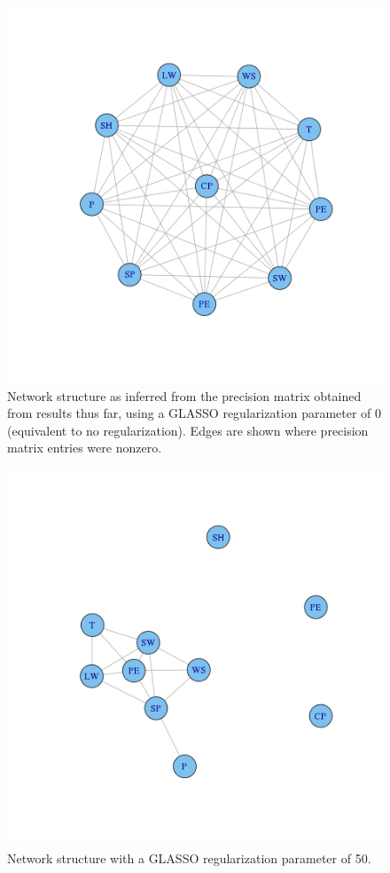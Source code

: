 \documentclass{article}
\begin{document}
\begin{figure}
\includegraphics[width=0.9\columnwidth]{images/data_0.png}
\caption{Network structure as inferred from the precision matrix obtained from results thus far, using a GLASSO regularization parameter of 0 (equivalent to no regularization). Edges are shown where precision matrix entries were nonzero.}
\label{fig:data_0}
\end{figure}

\begin{figure}
\includegraphics[width=0.9\columnwidth]{images/data_50.png}
\caption{Network structure with a GLASSO regularization parameter of 50.}
\label{fig:data_50}
\end{figure}
\end{document}
